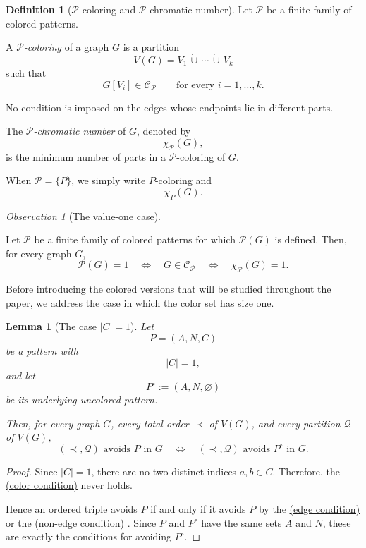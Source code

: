 \documentclass[12pt]{article}
\theoremstyle{plain}
\newtheorem{lemma}[theorem]{Lemma}
\theoremstyle{definition}
\newtheorem{definition}[theorem]{Definition}
\theoremstyle{remark}
\newtheorem{observation}[theorem]{Observation}
\theoremstyle{definition}
\newcommand{\edgecondition}{%
  \hyperref[def:avoid:cond:edge]{(edge condition)}\xspace
}
\newcommand{\nonedgecondition}{%
  \hyperref[def:avoid:cond:nonedge]{(non-edge condition)}\xspace
}
\newcommand{\colorcondition}{%
  \hyperref[def:avoid:cond:color]{(color condition)}\xspace
}
\begin{document}
\begin{definition}[\(\mathcal P\)-coloring and \(\mathcal P\)-chromatic number]
\label{def:P-coloring}
Let \(\mathcal P\) be a finite family of colored patterns.

A \emph{\(\mathcal P\)-coloring} of a graph \(G\) is a partition
\[
V(G)=V_1\,\dot\cup\,\cdots\,\dot\cup\,V_k
\]
such that
\[
G[V_i]\in\mathcal C_{\mathcal P}
\qquad
\text{for every }i=1,\dots,k.
\]

No condition is imposed on the edges whose endpoints lie in different parts.

The \emph{\(\mathcal P\)-chromatic number} of \(G\), denoted by
\[
\chi_{\mathcal P}(G),
\]
is the minimum number of parts in a \(\mathcal P\)-coloring of \(G\).

When \(\mathcal P=\{P\}\), we simply write \(P\)-coloring and
\[
\chi_P(G).
\]

\end{definition}

\begin{observation}[The value-one case]
\label{obs:value-one}

Let \(\mathcal P\) be a finite family of colored patterns for which
\(\mathcal P(G)\) is defined. Then, for every graph \(G\),
\[
\mathcal P(G)=1
\quad\Longleftrightarrow\quad
G\in\mathcal C_{\mathcal P}
\quad\Longleftrightarrow\quad
\chi_{\mathcal P}(G)=1.
\]
\end{observation}




Before introducing the colored versions that will be studied throughout the
paper, we address the case in which the color set has size one.



\begin{lemma}[The case \texorpdfstring{\(|C|=1\)}{|C|=1}]
\label{lem:color-set-size-one}
Let
\[
P=(A,N,C)
\]
be a pattern with
\[
|C|=1,
\]
and let
\[
P^{\circ}:=(A,N,\varnothing)
\]
be its underlying uncolored pattern.

Then, for every graph \(G\), every total order \(\prec\) of \(V(G)\),
and every partition \(\mathcal Q\) of \(V(G)\),
\[
(\prec,\mathcal Q)\text{ avoids }P\text{ in }G
\quad\Longleftrightarrow\quad
(\prec,\mathcal Q)\text{ avoids }P^{\circ}\text{ in }G.
\]
\end{lemma}

\begin{proof}
Since \(|C|=1\), there are no two distinct indices \(a,b\in C\).
Therefore, the \colorcondition{} never holds.

Hence an ordered triple avoids \(P\) if and only if it avoids \(P\)
by the \edgecondition{} or the \nonedgecondition{}. Since \(P\) and
\(P^{\circ}\) have the same sets \(A\) and \(N\), these are exactly
the conditions for avoiding \(P^{\circ}\).
\end{proof}
\end{document}
